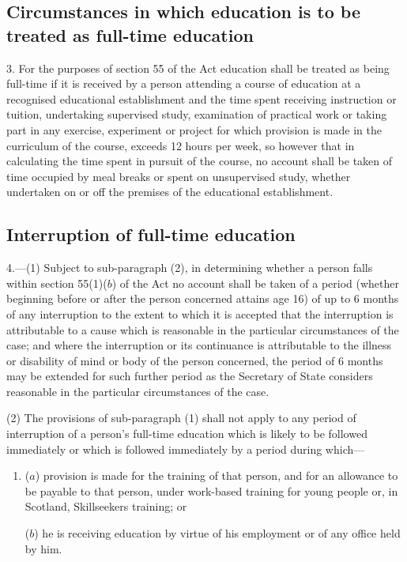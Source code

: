 \documentclass[12pt,a4paper]{article}
\begin{document}
\subsection*{Circumstances in which education is to be treated as full-time education}

3.  For the purposes of section 55 of the Act education shall be treated as being full-time if it is received by a person attending a course of education at a recognised educational establishment and the time spent receiving instruction or tuition, undertaking supervised study, examination of practical work or taking part in any exercise, experiment or project for which provision is made in the curriculum of the course, exceeds 12 hours per week, so however that in calculating the time spent in pursuit of the course, no account shall be taken of time occupied by meal breaks or spent on unsupervised study, whether undertaken on or off the premises of the educational establishment.

\subsection*{Interruption of full-time education}

4.---(1)  Subject to sub-paragraph (2), in determining whether a person falls within section 55(1)($b$)  of the Act no account shall be taken of a period (whether beginning before or after the person concerned attains age 16) of up to 6 months of any interruption to the extent to which it is accepted that the interruption is attributable to a cause which is reasonable in the particular circumstances of the case; and where the interruption or its continuance is attributable to the illness or disability of mind or body of the person concerned, the period of 6 months may be extended for such further period as the Secretary of State considers reasonable in the particular circumstances of the case.

(2) The provisions of sub-paragraph (1) shall not apply to any period of interruption of a person’s full-time education which is likely to be followed immediately or which is followed immediately by a period during which—
\begin{enumerate}\item[]
($a$) provision is made for the training of that person, and for an allowance to be payable to that person, under work-based training for young people or, in Scotland, Skillseekers training; or

($b$) he is receiving education by virtue of his employment or of any office held by him.
\end{enumerate}
\end{document}

